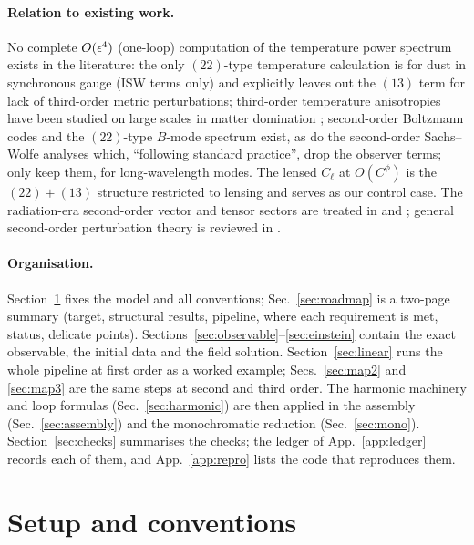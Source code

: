 \paragraph{Relation to existing work.}
No complete $O(\epsilon^4)$ (one-loop) computation of the temperature power spectrum exists in the literature:
the only $(22)$-type temperature calculation \cite{Tomita} is for dust in synchronous gauge (ISW terms only) and
explicitly leaves out the $(13)$ term for lack of third-order metric perturbations; third-order temperature
anisotropies have been studied on large scales in matter domination \cite{DAmico,Gao}; second-order Boltzmann
codes \cite{SONG,FKP} and the $(22)$-type $B$-mode spectrum \cite{FidlerBmode} exist, as do the second-order
Sachs--Wolfe analyses \cite{Boubekeur,HuangVernizzi,BMR1,BMR2,PUB} which, ``following standard practice'',
drop the observer terms; only \cite{MZ,CPV} keep them, for long-wavelength modes.  The lensed $C_\ell$ at
$O(C^\phi)$ \cite{Hu2000,LewisChallinor} is the $(22)+(13)$ structure restricted to lensing and serves as our
control case.  The radiation-era second-order vector and tensor sectors are treated in \cite{Lu} and
\cite{KT,Baumann,Espinosa}; general second-order perturbation theory is reviewed in \cite{MalikWands}.

\paragraph{Organisation.}  Section~\ref{sec:setup} fixes the model and all conventions; Sec.~\ref{sec:roadmap} is a two-page
summary (target, structural results, pipeline, where each requirement is met, status, delicate points).
Sections~\ref{sec:observable}--\ref{sec:einstein} contain the exact observable, the initial data and the field solution.
Section~\ref{sec:linear} runs the whole pipeline at first order as a worked example; Secs.~\ref{sec:map2} and \ref{sec:map3} are the
same steps at second and third order.  The harmonic machinery and loop formulas (Sec.~\ref{sec:harmonic}) are then applied in the
assembly (Sec.~\ref{sec:assembly}) and the monochromatic reduction (Sec.~\ref{sec:mono}).  Section~\ref{sec:checks} summarises the
checks; the ledger of App.~\ref{app:ledger} records each of them, and App.~\ref{app:repro} lists the code that reproduces them.

\section{Setup and conventions}
\label{sec:setup}

